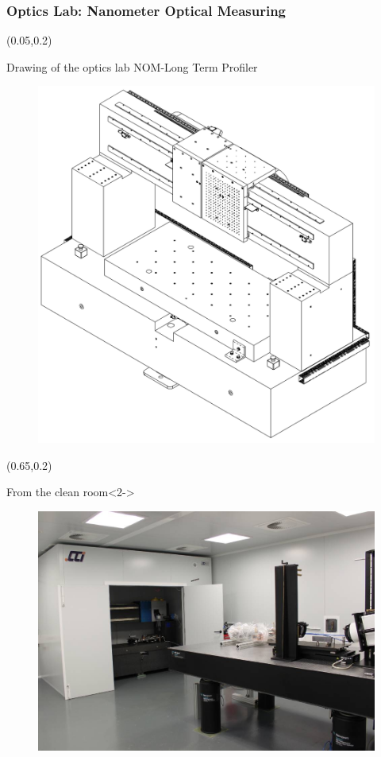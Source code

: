 \documentclass{beamer}
\begin{document}
\begin{frame}
\frametitle{Optics Lab: Nanometer Optical Measuring}
    \begin{textblock*}{50mm}(0.05\textwidth,0.2\textheight)
        \begin{block}{Drawing of the optics lab NOM-Long Term Profiler}
            \begin{figure}
                \includegraphics[width=\textwidth]{imgs/alba/laop/laop_ltp_isometric_view.png}
            \end{figure}
        \end{block}
    \end{textblock*}
    \begin{textblock*}{50mm}(0.65\textwidth,0.2\textheight)
        \begin{block}{From the clean room}<2->
            \begin{figure}
                \includegraphics[width=\textwidth]{imgs/alba/laop/01_LTP_a_sala_blanca.jpg}

\end{figure}
\end{block}
\end{textblock*}
\end{frame}
\end{document}
